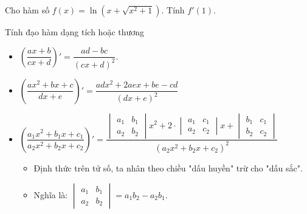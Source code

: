 \begin{vd}
	Cho hàm số $f(x)=\ln \left(x+\sqrt{x^2+1}\right)$. Tính $f'(1)$.
\end{vd} 

\begin{dang}{Tính đạo hàm dạng tích hoặc thương}
			\begin{itemize}
				\item [\ding{172}]  $\left(\dfrac{ax+ b}{cx + d}\right)' = \dfrac{ad - bc}{\left(cx + d\right)^2}$.
				\item [\ding{173}]  $\left(\dfrac{ax^2+bx+c}{dx+e}\right)' = \dfrac{adx^2+2aex+be-cd}{(dx+e)^2}$
				\item [\ding{174}]  $\left(\dfrac{a_1 x^2 + b_1 x + c_1}{a_2 x^2 + b_2 x + c_2}\right)' = \dfrac{\begin{vmatrix}
						a_1&b_1\\
						a_2&b_2
					\end{vmatrix}x^2 + 2 \cdot \begin{vmatrix}
						a_1&c_1\\
						a_2&c_2
					\end{vmatrix}x + \begin{vmatrix}
						b_1&c_1\\
						b_2&c_2
				\end{vmatrix}}{\left(a_2 x^2 + b_2 x + c_2\right)^2}$
				\begin{itemize}
					\item [$\bullet$] Định thức trên tử số, ta nhân theo chiều "dấu huyền" trừ cho "dấu sắc".
					\item [$\bullet$] Nghĩa là: $\begin{vmatrix}
						a_1&b_1\\
						a_2&b_2
					\end{vmatrix}=a_1b_2-a_2b_1.$
				\end{itemize}
			\end{itemize}
\end{dang}

